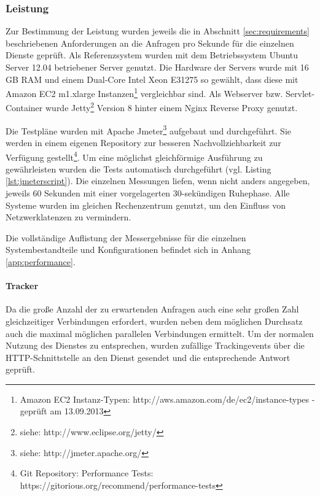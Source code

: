 \subsubsection{Leistung}\label{sec:performance}

Zur Bestimmung der Leistung wurden jeweils die in Abschnitt \ref{sec:requirements} beschriebenen Anforderungen an die Anfragen pro Sekunde für die einzelnen Dienste geprüft. Als Referenzsystem wurden mit dem Betriebssystem Ubuntu Server 12.04 betriebener Server genutzt.  Die Hardware der Servers wurde mit 16 GB RAM und einem Dual-Core Intel Xeon E31275 so gewählt, dass diese mit Amazon EC2 m1.xlarge Instanzen\footnote{Amazon EC2 Instanz-Typen: http://aws.amazon.com/de/ec2/instance-types - geprüft am 13.09.2013} vergleichbar sind. Als Webserver bzw. Servlet-Container wurde Jetty\footnote{siehe: http://www.eclipse.org/jetty/} Version 8 hinter einem Nginx \gls{Reverse Proxy} genutzt.

Die Testpläne wurden mit Apache Jmeter\footnote{siehe: http://jmeter.apache.org/} aufgebaut und durchgeführt. Sie werden in einem eigenen Repository zur besseren Nachvollziehbarkeit zur Verfügung gestellt\footnote{Git Repository: Performance Tests: https://gitorious.org/recommend/performance-tests}. Um eine möglichst gleichförmige Ausführung zu gewährleisten wurden die Tests automatisch durchgeführt (vgl. Listing \ref{lst:jmeterscript}). Die einzelnen Messungen liefen, wenn nicht anders angegeben, jeweils 60 Sekunden mit einer vorgelagerten 30-sekündigen Ruhephase. Alle Systeme wurden im gleichen Rechenzentrum genutzt, um den Einfluss von Netzwerklatenzen zu vermindern.

Die vollständige Auflistung der Messergebnisse für die einzelnen Systembestandteile und Konfigurationen befindet sich in Anhang \ref{app:performance}.

 

\newpage

\paragraph{Tracker} Da die große Anzahl der zu erwartenden Anfragen auch eine sehr großen Zahl gleichzeitiger Verbindungen erfordert, wurden neben dem möglichen Durchsatz auch die maximal möglichen parallelen Verbindungen ermittelt. Um der normalen Nutzung des Dienstes zu entsprechen, wurden zufällige Trackingevents über die HTTP-Schnittstelle an den Dienst gesendet und die entsprechende Antwort geprüft.


